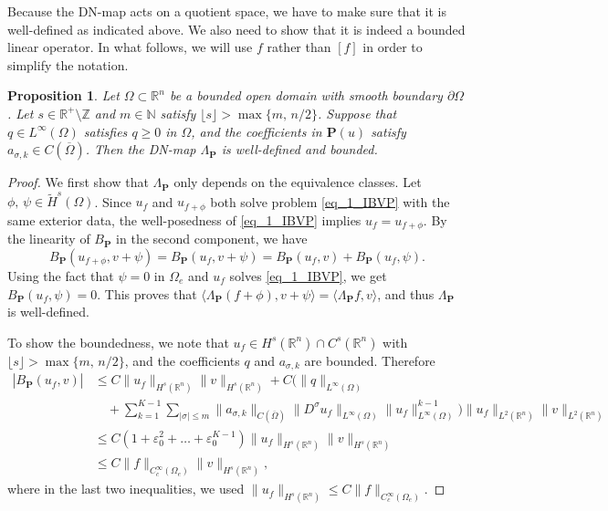 \documentclass [oneside,11pt] {amsart}
\newcommand{\floor}[1]{\lfloor #1 \rfloor}
\numberwithin{equation}{section}
\newtheorem{prop}{Proposition}[section]
\newcommand{\R}{\mathbb{R}}
\newcommand{\p}{\partial}
\newcommand{\LA}{\langle}
\newcommand{\RA}{\rangle}
\begin{document}
Because the DN-map acts on a quotient space, we have to make sure that it is well-defined as indicated above. We also need to show that it is indeed a bounded linear operator. In what follows, we will use $f$ rather than $[f]$ in order to simplify the notation.
\begin{prop}
Let $\Omega\subset\R^n$ be a bounded open domain with smooth 
boundary $\p\Omega$. Let $s\in \R^+\setminus \mathbb{Z}$ and $m\in \mathbb{N}$ satisfy $\floor{s}>\max\{m,\,n/2\}$.
Suppose that $q\in L^\infty(\Omega)$ satisfies $q\geq 0$ in $\Omega$, and the coefficients in $\mathbf{P}(u)$ satisfy $a_{\sigma,k}\in C (\overline\Omega)$.  
Then the DN-map $\Lambda_\mathbf{P}$ is well-defined and bounded.
\end{prop}
\begin{proof}
We first show that $\Lambda_\mathbf{P}$ only depends on the equivalence classes. Let $\phi,\,\psi\in \widetilde{H}^s(\Omega)$. Since $u_f$ and $u_{f+\phi}$ both solve problem \eqref{eq_1_IBVP} with the same exterior data, the well-posedness of \eqref{eq_1_IBVP} implies $u_f = u_{f+\phi}$.
By the linearity of $B_\mathbf{P}$ in the second component, we have
\[
B_\mathbf{P}(u_{f+\phi},v+\psi) = B_\mathbf{P}(u_f, v+\psi) = B_\mathbf{P}(u_f, v)+ B_\mathbf{P}(u_f, \psi).
\]
Using the fact that $\psi = 0$ in $\Omega_e$ and $u_f$ solves \eqref{eq_1_IBVP}, we get $B_\mathbf{P}(u_f,\psi) = 0$. This proves that $\LA \Lambda_\mathbf{P}(f+\phi), v+\psi  \RA =\LA \Lambda_\mathbf{P}f,v\RA $, and thus $\Lambda_\mathbf{P}$ is well-defined.


To show the boundedness, we note that $u_f\in H^s(\R^n)\cap C^s(\R^n)$ with $\floor{s}>\max\{m,\,n/2\}$, and the coefficients $q$ and $a_{\sigma,k}$ are bounded. Therefore
\begin{align*}
|B_\mathbf{P}(u_f, v)| 
&\le C \|u_f\|_{H^s(\R^n)}\|v\|_{H^s(\R^n)} + C\Big(\|q\|_{L^\infty(\Omega)}  \\
&\quad +\sum^{K-1}_{k=1}\sum_{|\sigma|\le m}\|a_{\sigma,k}\|_{C(\overline\Omega)}\|D^\sigma u_f\|_{L^\infty(\Omega)}\|u_f\|^{k-1}_{L^\infty(\Omega)}\Big)\|u_f\|_{L^2(\R^n)}\|v\|_{L^2(\R^n)}\\
&\le C(1 +\varepsilon_0^2+\ldots+\varepsilon_0^{K-1}) \|u_f\|_{H^s(\R^n)}\|v\|_{H^s(\R^n)}\\
&\leq C\|f\|_{C^\infty_c(\Omega_e)}\|v\|_{H^s(\R^n)},
\end{align*}
where in the last two inequalities, we used $\|u_f\|_{H^s(\R^n)}\leq C\|f\|_{C^\infty_c(\Omega_e)}$.
\end{proof}
\end{document}
